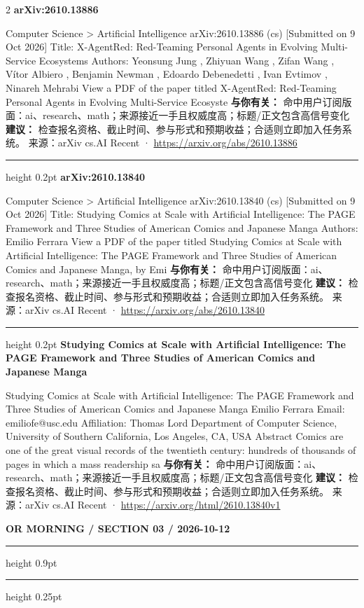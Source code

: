 \documentclass[10.5pt]{ctexart}
\begin{document}
\begin{multicols}{2}
{\large\bfseries arXiv:2610.13886}\par
Computer Science > Artificial Intelligence arXiv:2610.13886 (cs) [Submitted on 9 Oct 2026] Title: X-AgentRed: Red-Teaming Personal Agents in Evolving Multi-Service Ecosystems Authors: Yeonsung Jung , Zhiyuan Wang , Zifan Wang , Vítor Albiero , Benjamin Newman , Edoardo Debenedetti , Ivan Evtimov , Ninareh Mehrabi View a PDF of the paper titled X-AgentRed: Red-Teaming Personal Agents in Evolving Multi-Service Ecosyste
\textbf{与你有关：} 命中用户订阅版面：ai、research、math；来源接近一手且权威度高；标题/正文包含高信号变化
\textbf{建议：} 检查报名资格、截止时间、参与形式和预期收益；合适则立即加入任务系统。
{\footnotesize\color{ormuted} 来源：arXiv cs.AI Recent · \url{https://arxiv.org/abs/2610.13886}}
\vspace{2mm}
\hrule height 0.2pt
\vspace{2mm}
{\large\bfseries arXiv:2610.13840}\par
Computer Science > Artificial Intelligence arXiv:2610.13840 (cs) [Submitted on 9 Oct 2026] Title: Studying Comics at Scale with Artificial Intelligence: The PAGE Framework and Three Studies of American Comics and Japanese Manga Authors: Emilio Ferrara View a PDF of the paper titled Studying Comics at Scale with Artificial Intelligence: The PAGE Framework and Three Studies of American Comics and Japanese Manga, by Emi
\textbf{与你有关：} 命中用户订阅版面：ai、research、math；来源接近一手且权威度高；标题/正文包含高信号变化
\textbf{建议：} 检查报名资格、截止时间、参与形式和预期收益；合适则立即加入任务系统。
{\footnotesize\color{ormuted} 来源：arXiv cs.AI Recent · \url{https://arxiv.org/abs/2610.13840}}
\vspace{2mm}
\hrule height 0.2pt
\vspace{2mm}
{\large\bfseries Studying Comics at Scale with Artificial Intelligence: The PAGE Framework and Three Studies of American Comics and Japanese Manga}\par
Studying Comics at Scale with Artificial Intelligence: The PAGE Framework and Three Studies of American Comics and Japanese Manga Emilio Ferrara Email: emiliofe@usc.edu Affiliation: Thomas Lord Department of Computer Science, University of Southern California, Los Angeles, CA, USA Abstract Comics are one of the great visual records of the twentieth century: hundreds of thousands of pages in which a mass readership sa
\textbf{与你有关：} 命中用户订阅版面：ai、research、math；来源接近一手且权威度高；标题/正文包含高信号变化
\textbf{建议：} 检查报名资格、截止时间、参与形式和预期收益；合适则立即加入任务系统。
{\footnotesize\color{ormuted} 来源：arXiv cs.AI Recent · \url{https://arxiv.org/html/2610.13840v1}}
\end{multicols}
\newpage
{\small\bfseries OR MORNING / SECTION 03 / 2026-10-12}
\vspace{2mm}
\hrule height 0.9pt
\vspace{1.5mm}
\hrule height 0.25pt
\vspace{4mm}
\end{document}
